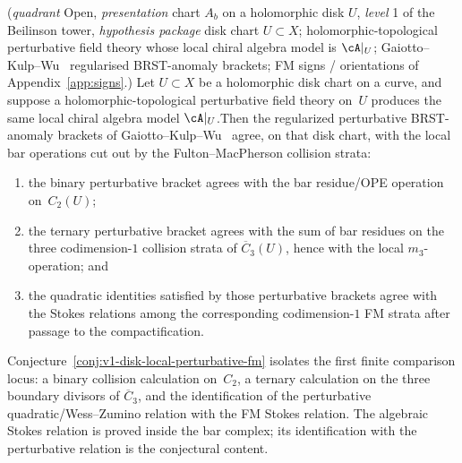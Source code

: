 \begin{conjecture}\label{conj:v1-disk-local-perturbative-fm}
\textup{(}\emph{quadrant} Open, \emph{presentation} chart $A_b$ on a
holomorphic disk $U$, \emph{level} 1 of the Beilinson tower,
\emph{hypothesis package} disk chart $U \subset X$;
holomorphic-topological perturbative field theory whose local chiral
algebra model is $\cA|_U$; Gaiotto--Kulp--Wu~\cite{GKW24} regularised
BRST-anomaly brackets; FM signs / orientations of
Appendix~\ref{app:signs}.\textup{)}
Let $U \subset X$ be a holomorphic disk chart on a curve, and suppose a
holomorphic-topological perturbative field theory on~$U$ produces the
same local chiral algebra model $\cA|_U$.\linebreak[1]
Then the regularized perturbative BRST-anomaly brackets
of Gaiotto--Kulp--Wu~\cite{GKW24} agree, on that disk chart, with
the local bar operations cut out by the Fulton--MacPherson collision
strata:
\begin{enumerate}[label=\textup{(\roman*)}]
\item the binary perturbative bracket agrees with the bar residue/OPE
 operation on~$C_2(U)$;
\item the ternary perturbative bracket agrees with the sum of bar
 residues on the three codimension-$1$ collision strata of
 $\overline{C}_3(U)$, hence with the local $m_3$-operation; and
\item the quadratic identities satisfied by those perturbative brackets
 agree with the Stokes relations among the corresponding
 codimension-$1$ FM strata after passage to the compactification.
\end{enumerate}
\end{conjecture}

\begin{remark}\label{rem:mc5-local-packet}
Conjecture~\ref{conj:v1-disk-local-perturbative-fm} isolates the first
finite comparison locus: a binary collision calculation on~$C_2$, a
ternary calculation on the three boundary divisors of
$\overline{C}_3$, and the identification of the perturbative
quadratic/Wess--Zumino relation with the FM Stokes relation.  The
algebraic Stokes relation is proved inside the bar complex; its
identification with the perturbative relation is the conjectural
content.
\end{remark}


